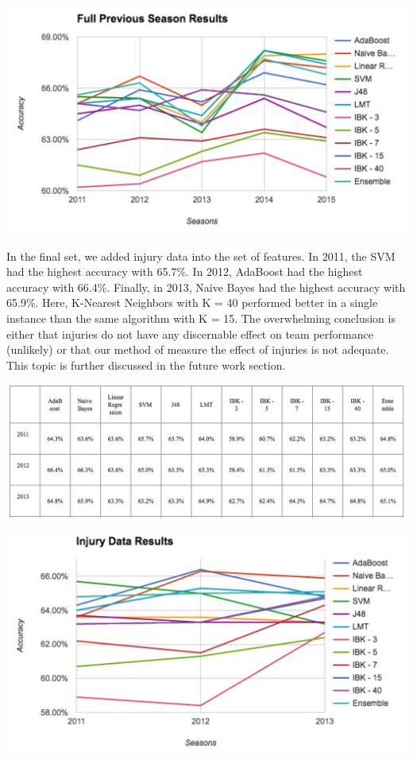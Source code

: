 \documentclass{article}
\begin{document}
\includegraphics[scale=0.7]{images/fullPreviousGraph.png}

In the final set, we added injury data into the set of features. In 2011, the SVM had the highest accuracy with 65.7\%. In 2012, AdaBoost had the highest accuracy with 66.4\%. Finally, in 2013, Naive Bayes had the highest accuracy with 65.9\%. Here, K-Nearest Neighbors with K = 40 performed better in a single instance than the same algorithm with K = 15. The overwhelming conclusion is either that injuries do not have any discernable effect on team performance (unlikely) or that our method of measure the effect of injuries is not adequate. This topic is further discussed in the future work section.

\includegraphics[scale=0.8]{images/injuryData.png}

\includegraphics[scale=0.7]{images/injuryGraph.png}
\end{document}
